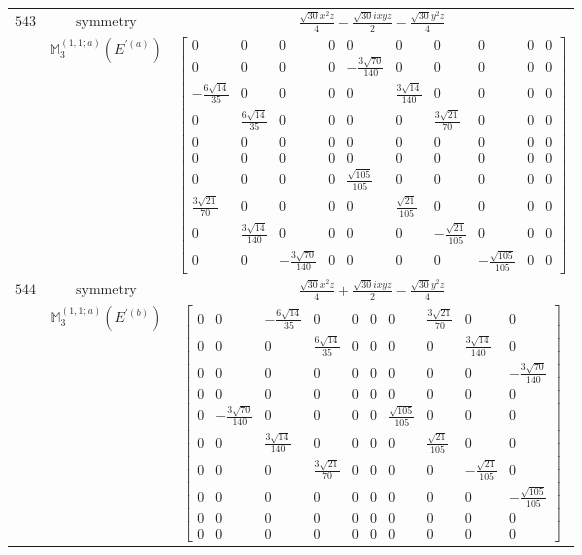 \documentclass[fleqn,8pt,landscape]{jsarticle}
\begin{document}
\begin{longtable}{ccc}
$ 543 $ & $ \text{symmetry} $ & $ \frac{\sqrt{30} x^{2} z}{4} - \frac{\sqrt{30} i x y z}{2} - \frac{\sqrt{30} y^{2} z}{4} $ \\
$  $ & $ \mathbb{M}_{3}^{(1,1;a)}(E^{\prime(a)}) $ & $ \begin{bmatrix} 0 & 0 & 0 & 0 & 0 & 0 & 0 & 0 & 0 & 0 \\ 0 & 0 & 0 & 0 & - \frac{3 \sqrt{70}}{140} & 0 & 0 & 0 & 0 & 0 \\ - \frac{6 \sqrt{14}}{35} & 0 & 0 & 0 & 0 & \frac{3 \sqrt{14}}{140} & 0 & 0 & 0 & 0 \\ 0 & \frac{6 \sqrt{14}}{35} & 0 & 0 & 0 & 0 & \frac{3 \sqrt{21}}{70} & 0 & 0 & 0 \\ 0 & 0 & 0 & 0 & 0 & 0 & 0 & 0 & 0 & 0 \\ 0 & 0 & 0 & 0 & 0 & 0 & 0 & 0 & 0 & 0 \\ 0 & 0 & 0 & 0 & \frac{\sqrt{105}}{105} & 0 & 0 & 0 & 0 & 0 \\ \frac{3 \sqrt{21}}{70} & 0 & 0 & 0 & 0 & \frac{\sqrt{21}}{105} & 0 & 0 & 0 & 0 \\ 0 & \frac{3 \sqrt{14}}{140} & 0 & 0 & 0 & 0 & - \frac{\sqrt{21}}{105} & 0 & 0 & 0 \\ 0 & 0 & - \frac{3 \sqrt{70}}{140} & 0 & 0 & 0 & 0 & - \frac{\sqrt{105}}{105} & 0 & 0 \end{bmatrix} $ \\ \hline
$ 544 $ & $ \text{symmetry} $ & $ \frac{\sqrt{30} x^{2} z}{4} + \frac{\sqrt{30} i x y z}{2} - \frac{\sqrt{30} y^{2} z}{4} $ \\
$  $ & $ \mathbb{M}_{3}^{(1,1;a)}(E^{\prime(b)}) $ & $ \begin{bmatrix} 0 & 0 & - \frac{6 \sqrt{14}}{35} & 0 & 0 & 0 & 0 & \frac{3 \sqrt{21}}{70} & 0 & 0 \\ 0 & 0 & 0 & \frac{6 \sqrt{14}}{35} & 0 & 0 & 0 & 0 & \frac{3 \sqrt{14}}{140} & 0 \\ 0 & 0 & 0 & 0 & 0 & 0 & 0 & 0 & 0 & - \frac{3 \sqrt{70}}{140} \\ 0 & 0 & 0 & 0 & 0 & 0 & 0 & 0 & 0 & 0 \\ 0 & - \frac{3 \sqrt{70}}{140} & 0 & 0 & 0 & 0 & \frac{\sqrt{105}}{105} & 0 & 0 & 0 \\ 0 & 0 & \frac{3 \sqrt{14}}{140} & 0 & 0 & 0 & 0 & \frac{\sqrt{21}}{105} & 0 & 0 \\ 0 & 0 & 0 & \frac{3 \sqrt{21}}{70} & 0 & 0 & 0 & 0 & - \frac{\sqrt{21}}{105} & 0 \\ 0 & 0 & 0 & 0 & 0 & 0 & 0 & 0 & 0 & - \frac{\sqrt{105}}{105} \\ 0 & 0 & 0 & 0 & 0 & 0 & 0 & 0 & 0 & 0 \\ 0 & 0 & 0 & 0 & 0 & 0 & 0 & 0 & 0 & 0 \end{bmatrix} $ \\ \hline

\end{longtable}
\end{document}
